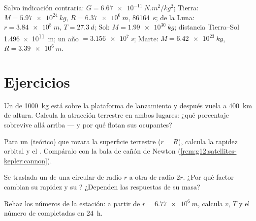 \begin{remark}\label{rem:g12:satellites-kepler:data}
Salvo indicación contraria: $G = \qty{6.67e-11}{N.m^2/kg^2}$; Tierra:
$M = \qty{5.97e24}{kg}$, $R = \qty{6.37e6}{m}$,  \qty{86164}{s};  de
la Luna: $r = \qty{3.84e8}{m}$, $T = \qty{27.3}{d}$; Sol: $M = \qty{1.99e30}{kg}$;
distancia Tierra--Sol \qty{1.496e11}{m}; un año $= \qty{3.156e7}{s}$; Marte:
$M = \qty{6.42e23}{kg}$, $R = \qty{3.39e6}{m}$.
\end{remark}

\section{Ejercicios}

\begin{exercise}[$\star$]\label{exo:g12:satellites-kepler:1}
Un  de \qty{1000}{kg} está sobre la plataforma de lanzamiento y después vuela a
\qty{400}{km} de altura. Calcula la atracción terrestre en ambos lugares: ¿qué
porcentaje sobrevive allá arriba --- y por qué flotan sus ocupantes?
\end{exercise}

\begin{exercise}[$\star$]\label{exo:g12:satellites-kepler:2}
Para un  (teórico) que rozara la superficie terrestre ($r = R$), calcula la
rapidez orbital y el . Compáralo con la bala de cañón de Newton
(\cref{rem:g12:satellites-kepler:cannon}).
\end{exercise}

\begin{exercise}[$\star$]\label{exo:g12:satellites-kepler:3}
Se traslada un  de una  circular de radio $r$ a otra de radio $2r$. ¿Por
qué factor cambian su rapidez y su ? ¿Dependen las respuestas de su masa?
\end{exercise}

\begin{exercise}[$\star$]\label{exo:g12:satellites-kepler:4}
Rehaz los números de la estación: a partir de $r = \qty{6.77e6}{m}$, calcula $v$, $T$ y
el número de  completadas en \qty{24}{h}.
\end{exercise}

